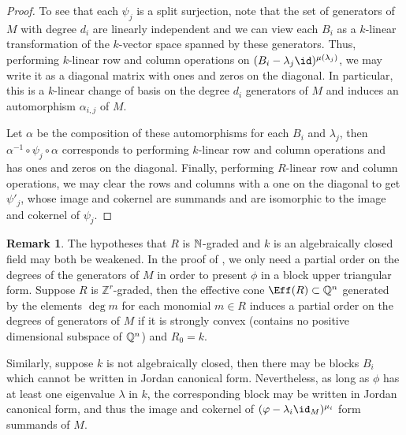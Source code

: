 \documentclass[12pt]{article}
\def\ZZ{\mathbb Z}
\theoremstyle{theorem}
\numberwithin{thm}{section}
\theoremstyle{definition}
\newtheorem{rem}[thm]{Remark}
\begin{document}
\begin{proof}
  To see that each $\psi_j$ is a split surjection, note that the set of generators of $M$ with degree $d_i$ are linearly independent and we can view each $B_i$ as a $k$-linear transformation of the $k$-vector space spanned by these generators. Thus, performing $k$-linear row and column operations on $(B_i - \lambda_j \id)^{\mu(\lambda_j)}$, we may write it as a diagonal matrix with ones and zeros on the diagonal. In particular, this is a $k$-linear change of basis on the degree $d_i$ generators of $M$ and induces an automorphism $\alpha_{i,j}$ of $M$.

  Let $\alpha$ be the composition of these automorphisms for each $B_i$ and $\lambda_j$, then $\alpha^{-1}\circ\psi_j\circ\alpha$ corresponds to performing $k$-linear row and column operations and has ones and zeros on the diagonal. Finally, performing $R$-linear row and column operations, we may clear the rows and columns with a one on the diagonal to get $\psi'_j$, whose image and cokernel are summands and are isomorphic to the image and cokernel of $\psi_j$.
\end{proof}

\begin{rem}
  The hypotheses that $R$ is $\mathbb N$-graded and $k$ is an algebraically closed field may both be weakened.
  In the proof of , we only need a partial order on the degrees of the generators of $M$ in order to present $\phi$ in a block upper triangular form. Suppose $R$ is $\ZZ^r$-graded, then the effective cone $\Eff(R)\subset\Q^n$ generated by the elements $\deg m$ for each monomial $m \in R$ induces a partial order on the degrees of generators of $M$ if it is strongly convex (contains no positive dimensional subspace of $\mathbb Q^n$) and $R_0 = k$. %

  Similarly, suppose $k$ is not algebraically closed, then there may be blocks $B_i$ which cannot be written in Jordan canonical form. Nevertheless, as long as $\phi$ has at least one eigenvalue $\lambda$ in $k$, the corresponding block may be written in Jordan canonical form, and thus the image and cokernel of $(\phi - \lambda_i\id_M)^{\mu_i}$ form summands of $M$.
\end{rem}
\end{document}

